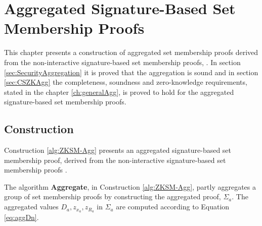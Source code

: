 \chapter{Aggregated Signature-Based Set Membership Proofs}
\label{ch:AggSM}
\label{sec:ConstructAggregation}
This chapter presents a construction of aggregated set membership proofs derived from the non-interactive signature-based set membership proofs, \cite{RANGE-SET}.   In section \ref{sec:SecurityAggregation} it is proved that the aggregation is sound and in section \ref{sec:CSZKAgg} the completeness, soundness and zero-knowledge requirements, stated in the chapter \ref{ch:generalAgg}, is proved to hold for the aggregated signature-based set membership proofs.

\section{Construction}
Construction \ref{alg:ZKSM-Agg} presents an aggregated signature-based set membership proof, derived from the non-interactive signature-based set membership proofs \cite{RANGE-SET}.

The algorithm \textbf{Aggregate}, in Construction \ref{alg:ZKSM-Agg}, partly aggregates a group of set membership proofs by constructing the aggregated proof,
$\Sigma_a $. The aggregated values $D_a,z_{x_a},z_{R_a}$ in $\Sigma_a$ are computed according to Equation \eqref{eq:aggDn}. 

